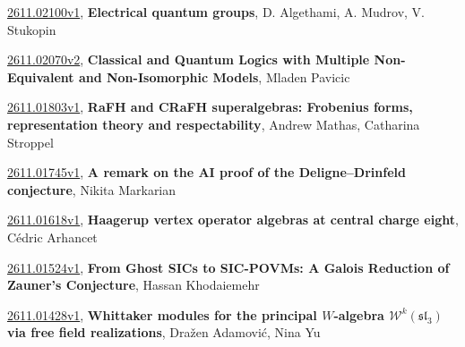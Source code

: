 \documentclass[9pt, a4paper]{article}
\theoremstyle{plain}
\theoremstyle{definition}
\theoremstyle{remark}
\newcommand{\arxiv}[3]{\href{https://arxiv.org/abs/#1}{#1}, \textbf{\textcolor{arxivblue}{#2}}, #3}
\begin{document}
\arxiv{2611.02100v1}{Electrical quantum groups}{D. Algethami, A. Mudrov, V. Stukopin}

\arxiv{2611.02070v2}{Classical and Quantum Logics with Multiple Non-Equivalent and Non-Isomorphic Models}{Mladen Pavicic}

\arxiv{2611.01803v1}{RaFH and CRaFH superalgebras: Frobenius forms, representation theory and respectability}{Andrew Mathas, Catharina Stroppel}

\arxiv{2611.01745v1}{A remark on the AI proof of the Deligne--Drinfeld conjecture}{Nikita Markarian}

\arxiv{2611.01618v1}{Haagerup vertex operator algebras at central charge eight}{Cédric Arhancet}

\arxiv{2611.01524v1}{From Ghost SICs to SIC-POVMs: A Galois Reduction of Zauner's Conjecture}{Hassan Khodaiemehr}

\arxiv{2611.01428v1}{Whittaker modules for the principal $W$-algebra $\mathcal W^k(\mathfrak{sl}_3)$ via free field realizations}{Dražen Adamović, Nina Yu}

\end{document}
